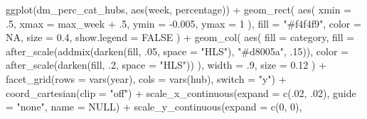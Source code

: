 \documentclass[
]{book}
\newenvironment{Shaded}{\begin{snugshade}}{\end{snugshade}}
\newcommand{\AttributeTok}[1]{\textcolor[rgb]{0.77,0.63,0.00}{#1}}
\newcommand{\ConstantTok}[1]{\textcolor[rgb]{0.00,0.00,0.00}{#1}}
\newcommand{\DecValTok}[1]{\textcolor[rgb]{0.00,0.00,0.81}{#1}}
\newcommand{\FloatTok}[1]{\textcolor[rgb]{0.00,0.00,0.81}{#1}}
\newcommand{\FunctionTok}[1]{\textcolor[rgb]{0.00,0.00,0.00}{#1}}
\newcommand{\NormalTok}[1]{#1}
\newcommand{\SpecialCharTok}[1]{\textcolor[rgb]{0.00,0.00,0.00}{#1}}
\newcommand{\StringTok}[1]{\textcolor[rgb]{0.31,0.60,0.02}{#1}}
\begin{document}
\begin{Shaded}
\begin{Highlighting}[]
\FunctionTok{ggplot}\NormalTok{(dm\_perc\_cat\_hubs, }\FunctionTok{aes}\NormalTok{(week, percentage)) }\SpecialCharTok{+}
  \FunctionTok{geom\_rect}\NormalTok{(}
    \FunctionTok{aes}\NormalTok{(}
      \AttributeTok{xmin =}\NormalTok{ .}\DecValTok{5}\NormalTok{,}
      \AttributeTok{xmax =}\NormalTok{ max\_week }\SpecialCharTok{+}\NormalTok{ .}\DecValTok{5}\NormalTok{,}
      \AttributeTok{ymin =} \SpecialCharTok{{-}}\FloatTok{0.005}\NormalTok{,}
      \AttributeTok{ymax =} \DecValTok{1}
\NormalTok{    ),}
    \AttributeTok{fill =} \StringTok{"\#f4f4f9"}\NormalTok{,}
    \AttributeTok{color =} \ConstantTok{NA}\NormalTok{,}
    \AttributeTok{size =} \FloatTok{0.4}\NormalTok{,}
    \AttributeTok{show.legend =} \ConstantTok{FALSE}
\NormalTok{  ) }\SpecialCharTok{+}
  \FunctionTok{geom\_col}\NormalTok{(}
    \FunctionTok{aes}\NormalTok{(}
      \AttributeTok{fill =}\NormalTok{ category,}
      \AttributeTok{fill =} \FunctionTok{after\_scale}\NormalTok{(}\FunctionTok{addmix}\NormalTok{(}\FunctionTok{darken}\NormalTok{(fill, .}\DecValTok{05}\NormalTok{, }
                                       \AttributeTok{space =} \StringTok{"HLS"}\NormalTok{), }
                                \StringTok{"\#d8005a"}\NormalTok{, }
\NormalTok{                                .}\DecValTok{15}\NormalTok{)),}
      \AttributeTok{color =} \FunctionTok{after\_scale}\NormalTok{(}\FunctionTok{darken}\NormalTok{(fill, .}\DecValTok{2}\NormalTok{, }
                                 \AttributeTok{space =} \StringTok{"HLS"}\NormalTok{))}
\NormalTok{    ),}
    \AttributeTok{width =}\NormalTok{ .}\DecValTok{9}\NormalTok{,}
    \AttributeTok{size =} \FloatTok{0.12}
\NormalTok{  ) }\SpecialCharTok{+}
  \FunctionTok{facet\_grid}\NormalTok{(}\AttributeTok{rows =} \FunctionTok{vars}\NormalTok{(year), }
             \AttributeTok{cols =} \FunctionTok{vars}\NormalTok{(hub), }
             \AttributeTok{switch =} \StringTok{"y"}\NormalTok{) }\SpecialCharTok{+}
  \FunctionTok{coord\_cartesian}\NormalTok{(}\AttributeTok{clip =} \StringTok{"off"}\NormalTok{) }\SpecialCharTok{+}
  \FunctionTok{scale\_x\_continuous}\NormalTok{(}\AttributeTok{expand =} \FunctionTok{c}\NormalTok{(.}\DecValTok{02}\NormalTok{, .}\DecValTok{02}\NormalTok{), }
                     \AttributeTok{guide =} \StringTok{"none"}\NormalTok{, }
                     \AttributeTok{name =} \ConstantTok{NULL}\NormalTok{) }\SpecialCharTok{+}
  \FunctionTok{scale\_y\_continuous}\NormalTok{(}\AttributeTok{expand =} \FunctionTok{c}\NormalTok{(}\DecValTok{0}\NormalTok{, }\DecValTok{0}\NormalTok{), }

\end{Highlighting}
\end{Shaded}
\end{document}
